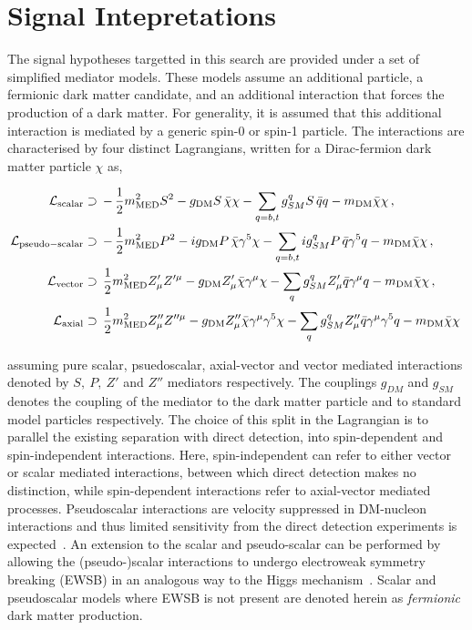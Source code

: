 \section{Signal Intepretations}
The signal hypotheses targetted in this search are provided under a set of simplified mediator models. These models assume an additional particle, 
a fermionic dark matter candidate, and an additional interaction that forces the production of a dark matter. 
For generality, it is assumed that this additional interaction is mediated by a generic spin-0 or spin-1 particle. 
The interactions are characterised by four distinct Lagrangians, written for a Dirac-fermion dark matter particle $\chi$ as, 

\begin{align}
\label{eq:LS} 
\mathcal{L}_{\mathrm{scalar}}&\supset\, -\,\frac{1}{2}m_{\rm MED}^2 S^2 - g_{\rm DM}  S \, \bar{\chi}\chi
 - \sum_{q=b,t} g_{SM}^q S \, \bar{q}q  - m_{\rm DM} \bar{\chi}\chi \,,
 \\
 \label{eq:LP} 
\mathcal{L}_{\rm{pseudo-scalar}}&\supset\, -\,\frac{1}{2}m_{\rm MED}^2 P^2 - i g_{\rm DM}  P \, \bar{\chi} \gamma^5\chi
 -\sum_{q=b,t}  i g_{SM}^q  P \, \bar{q}  \gamma^5q  - m_{\rm DM} \bar{\chi}\chi\,,
 \\
 \label{eq:LV} 
\mathcal{L}_{\mathrm{vector}}&\supset \, \frac{1}{2}m_{\rm MED}^2 Z'_{\mu} Z'^{\mu} - g_{\rm DM}Z'_{\mu} \bar{\chi}\gamma^{\mu}\chi -\sum_q g_{SM}^q Z'_{\mu} \bar{q}\gamma^{\mu}q - m_{\rm DM} \bar{\chi}\chi\,,
 \\
 \label{eq:LA} 
\mathcal{L}_{\rm{axial}}&\supset\,  \frac{1}{2}m_{\rm MED}^2 Z''_{\mu} Z''^{\mu} - g_{\rm DM} Z''_{\mu} \bar{\chi}\gamma^{\mu}\gamma^5\chi -\sum_q g_{SM}^q Z''_{\mu} \bar{q}\gamma^{\mu}\gamma^5q - m_{\rm DM} \bar{\chi}\chi\,
\end{align}

assuming pure scalar, psuedoscalar, axial-vector and vector mediated interactions denoted by $S,~P,~Z'$ and $Z''$ mediators respectively. 
The couplings $g_{DM}$ and $g_{SM}$ denotes the coupling of the mediator to the dark matter particle and to standard model particles respectively. 
The choice of this split in the Lagrangian is to parallel the existing separation with direct detection, into spin-dependent and spin-independent interactions. 
Here, spin-independent can refer to either vector or scalar mediated interactions, between which direct detection makes no distinction, while 
spin-dependent interactions refer to axial-vector mediated processes. 
Pseudoscalar interactions are velocity suppressed in DM-nucleon interactions and thus limited sensitivity from the direct detection experiments is expected~\cite{Haisch:2012kf}. 
An extension to the scalar and pseudo-scalar can be performed by allowing the (pseudo-)scalar interactions to undergo electroweak symmetry breaking (EWSB) in an analogous way to 
the Higgs mechanism~\cite{Khoze:2015sra,Hambye:2013sna,Khoze:2014xha,Khoze:2014woa,Altmannshofer:2014vra,Carone:2013wla,Heikinheimo:2013fta}. Scalar and pseudoscalar models 
where EWSB is not present are denoted herein as \emph{fermionic} dark matter production.


